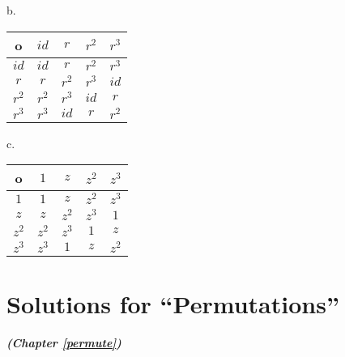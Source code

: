 b.
\begin{center}
	\begin{tabular}{c| c c c c}
		o & $id$ & $r$ & $r^2$ & $r^3$\\
		\hline
		$id$ & $id$ & $r$ & $r^2$ & $r^3$\\
		$r$ & $r$ & $r^2$ & $r^3$ & $id$\\
		$r^2$ & $r^2$ & $r^3$ & $id$ & $r$\\
		$r^3$ & $r^3$ & $id$ & $r$ & $r^2$
	\end{tabular}
\end{center}
c.
\begin{center}
	\begin{tabular}{c| c c c c}
		o & $1$ & $z$ & $z^2$ & $z^3$\\
		\hline
		$1$ & $1$ & $z$ & $z^2$ & $z^3$\\
		$z$ & $z$ & $z^2$ & $z^3$ & $1$\\
		$z^2$ & $z^2$ & $z^3$ & $1$ & $z$\\
		$z^3$ & $z^3$ & $1$ & $z$ & $z^2$
	\end{tabular}
\end{center}

\section{Solutions for ``Permutations''}
\noindent\textbf{\textit{ (Chapter \ref{permute})}}\bigskip

